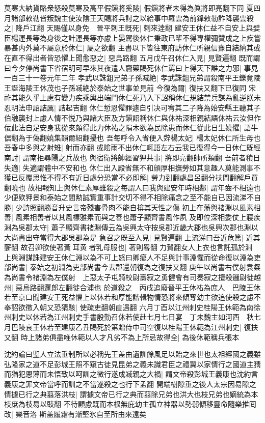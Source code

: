 莫寒大納貨賂衆怒殺莫寒及高平假鎭將奚陵|{
	假鎭將者未得為眞將即亮翻下同}
夏四月諸部敕勒皆叛魏主使汝隂王天賜將兵討之以給事中羅雲為前鋒敕勒詐降襲雲殺之|{
	降戶江翻}
天賜僅以身免　晉平刺王旣死|{
	刺來逹翻}
建安王休仁益不自安上與嬖臣楊運長等為身後之計運長等亦慮上晏駕後休仁秉政已輩不得專權彌贊成之上疾嘗暴甚内外莫不屬意於休仁|{
	屬之欲翻}
主書以下皆往東府訪休仁所親信豫自結納其或在直不得出者皆恐懼上聞愈惡之|{
	惡烏路翻}
五月戊午召休仁入見|{
	見賢遍翻}
既而謂曰今夕停尚書下省宿明可早來其夜遣人齎藥賜死休仁罵曰上得天下誰之力邪|{
	事見一百三十一卷元年二年}
孝武以誅鉏兄弟子孫㓕絶|{
	孝武誅鉏兄弟謂殺南平王鑠竟陵王誕海陵王休茂也子孫㓕絶於泰始之世事並見前}
今復為爾|{
	復扶又翻下已復同}
宋祚其能久乎上慮有變力疾乘輿出端門休仁死乃入下詔稱休仁規結禁兵謀為亂逆朕未忍明法申詔詰厲|{
	詰起吉翻}
休仁慙恩懼罪遽自引决可宥其二子降為始安縣王聽其子伯融襲封上慮人情不悦乃與諸大臣及方鎭詔稱休仁與休祐深相親結語休祐云汝但作佞此法自足安身我從來頗得此力休祐之隕木欲為民除患而休仁從此日生嬈懼|{
	語牛倨翻為于偽翻嬈集韻爾紹翻擾也}
吾每呼令入省便入辤楊太妃|{
	楊太妃休仁所生母也}
吾春中多與之射雉|{
	射而亦翻}
或隂雨不出休仁輒語左右云我已復得今一日休仁既經南討|{
	謂南拒尋陽之兵故也}
與宿衛將帥經習狎共事|{
	將即亮翻帥所類翻}
吾前者積日失適|{
	失適謂體中不安和也}
休仁出入殿省無不和顔厚相撫勞如其意趣人莫能測事不獲已反覆思惟不得不有近日處分恐當不必即解|{
	勞力到翻處昌呂翻分扶問翻解戶買翻曉也}
故相報知上與休仁素厚雖殺之每謂人曰我與建安年時相鄰|{
	謂年齒不相遠也}
少便欵狎景和泰始之間勲誠實重事計交切不得不相除痛念之至不能自已因流涕不自勝|{
	少詩照翻勝音升史言帝殘害骨肉不能自揜其天性之傷}
初上在藩與禇淵以風素相善|{
	風素相善者以其風標雅素而與之善也蕭子顯齊書風作夙}
及即位深相委仗上寢疾淵為吳郡太守|{
	蕭子顯齊書禇淵傳云為吳興太守按吳郡近畿大郡也吳興次郡也淵以大尚書出守當得大郡吳郡為是}
急召之既至入見|{
	見賢遍翻}
上流涕曰吾近危篤|{
	近其蘄翻}
故召卿欲使著黃耳黄者乳母服也|{
	著則畧翻力賀翻女人上衣也言託孤於淵}
上與淵謀誅建安王休仁淵以為不可上怒曰卿癡人不足與計事淵懼而從命復以淵為吏部尚書|{
	泰始之初淵為吏部尚書今去郡還朝復為之復扶又翻}
庚午以尚書右僕射袁粲為尚書令禇淵為左僕射　上惡太子屯騎校尉壽寂之勇健會有司奏寂之擅殺邏尉徙越州|{
	惡烏路翻邏郎左翻徙合浦也}
於道殺之　丙戌追廢晉平王休祐為庶人　巴陵王休若至京口聞建安王死益懼上以休若和厚能諧輯物情恐將來傾奪幼主欲追使殺之慮不奉詔欲徵入朝又恐猜駭|{
	使疏吏翻朝直遇翻}
六月丁酉以江州刺史桂陽王休範為南徐州刺史以休若為江州刺史手書殷勤召休若使赴七月七日宴　丁未魏主如河西　秋七月巴陵哀王休若至建康乙丑賜死於第贈侍中司空復以桂陽王休範為江州刺史|{
	復扶又翻}
時上諸弟俱盡唯休範以人才凡劣不為上所忌故得全|{
	為後休範稱兵張本}


沈約論曰聖人立法垂制所以必稱先王盖由遺訓餘風足以貽之來世也太祖經國之義雖弘隆家之道不足彭城王照不窺古徒見昆弟之義未識君臣之禮冀以家情行之國道主猜而猶犯恩薄而未悟致以呵訓之微行遂成㓕親之大禍|{
	謂文帝殺彭城王義康也沈約言義康之罪文帝當呼而訓之不當遂殺之也行下孟翻}
開端樹隙垂之後人太宗因易隙之情據已行之典翦落洪枝|{
	謂據文帝已行之典而翦除兄弟也洪大也枝兄弟也嫡統為本枝庶為枝易以豉翻}
不待顧慮既而本根無庇幼主孤立神器以勢弱傾移靈命隨樂推囘改|{
	樂音洛}
斯盖履霜有漸堅氷自至所由來遠矣

